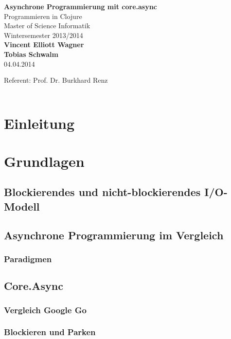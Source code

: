 \documentclass[a4paper,12pt,numbers=noenddot, chapteratlists=0pt]{scrreprt}
\begin{document}
\begin{titlepage}
\begin{center}
\Huge
\textbf{Asynchrone Programmierung mit core.async}\\
\vspace{1cm}
\Large
\vspace{1cm}
Programmieren in Clojure\\
\vspace{2cm}
Master of Science Informatik\\
Wintersemester 2013/2014\\
\vspace{2cm}
\textbf{Vincent Elliott Wagner}\\
\textbf{Tobias Schwalm}\\
\vspace{2cm}
04.04.2014
\end{center}
\vfill
Referent: Prof. Dr. Burkhard Renz\\\\
\end{titlepage}
\clearpage
{}
\tableofcontents
\renewcommand{\thechapter}{\arabic{chapter}}
\chapter{Einleitung}
\chapter{Grundlagen}
\section{Blockierendes und nicht-blockierendes I/O-Modell}
\section{Asynchrone Programmierung im Vergleich}
\subsection*{Paradigmen}
\section{Core.Async}
\subsection*{Vergleich Google Go}
\subsection*{Blockieren und Parken}
\end{document}
